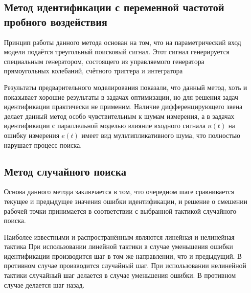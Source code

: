 
\subsection{Метод идентификации с переменной частотой пробного воздействия} %

Принцип работы данного метода
основан на том, что на параметрический вход модели подаётся треугольный поисковый сигнал.
Этот сигнал генерируется специальным генератором,
состоящего из управляемого генератора прямоугольных колебаний, 
счётного триггера и интегратора%


Результаты предварительного моделирования показали,
что данный метод, хоть и показывает хорошие результаты
в задачах оптимизации, но для решения задач идентификации 
практически не применим. Наличие дифференцирующего 
звена делает данный метод особо чувствительным к шумам
измерения, а в задачах идентификации с параллельной моделью
влияние входного сигнала \( u(t) \)
на ошибку измерения \( e(t) \) 
имеет вид мультипликативного шума,
что полностью нарушает процесс поиска.


\subsection{Метод случайного поиска} %

Основа данного метода заключается в том, что
очередном шаге сравнивается текущее и предыдущее
значения ошибки идентификации, и решение о смешении
рабочей точки принимается в соответствии с выбранной
тактикой случайного поиска.

Наиболее известными и распространённым
являются линейная и нелинейная тактика
При использовании линейной тактики
в случае уменьшения ошибки идентификации
производится шаг в том же направлении, что и предыдущий.
В противном случае производится случайный шаг.
При использовании нелинейной тактики
случайный шаг делается в случае уменьшения ошибки.
В противном случае делается шаг назад.

